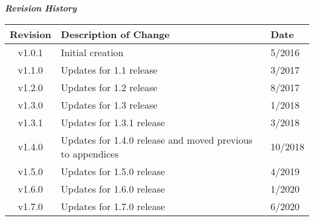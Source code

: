 \maketitle
\thispagestyle{empty}
\newpage

	\begin{center}
	\textit{\textbf{Revision History}}
		\begin{table}[H]
		\label{table:revisions} %
			\begin{tabularx}{\textwidth}{|c|X|l|}
			\hline
			\rowcolor{blue}
			\textbf{Revision} & \textbf{Description of Change} & \textbf{Date} \\
		    \hline
			v1.0.1 & Initial creation & 5/2016 \\
			\hline
			v1.1.0 & Updates for 1.1 release & 3/2017 \\
			\hline
			v1.2.0 & Updates for 1.2 release & 8/2017 \\
			\hline
			v1.3.0 & Updates for 1.3 release & 1/2018 \\
			\hline
			v1.3.1 & Updates for 1.3.1 release & 3/2018 \\
			\hline
			v1.4.0 & Updates for 1.4.0 release and moved previous to appendices & 10/2018 \\
			\hline
			v1.5.0 & Updates for 1.5.0 release & 4/2019 \\
			\hline
			v1.6.0 & Updates for 1.6.0 release & 1/2020 \\
			\hline
			v1.7.0 & Updates for 1.7.0 release & 6/2020 \\
			\hline
			\end{tabularx}
		\end{table}
	\end{center}

\newpage

\tableofcontents
\renewcommand\thesection{\Roman{section}}
\renewcommand\thesubsection{\thesection-\arabic{subsection}}
\newpage
{}
